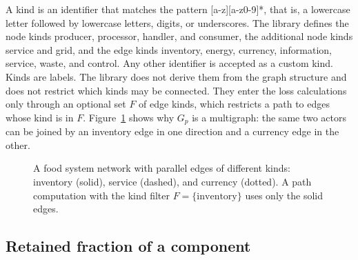 \documentclass[12pt]{article}
\newcommand{\code}[1]{{\ttfamily\def\_{\textunderscore\allowbreak}#1}}
\theoremstyle{plain}
\theoremstyle{definition}
\begin{document}
A kind is an identifier that matches the pattern \code{[a-z][a-z0-9\_]*}, that is, a lowercase letter followed by lowercase letters, digits, or underscores. The library defines the node kinds producer, processor, handler, and consumer, the additional node kinds service and grid, and the edge kinds inventory, energy, currency, information, service, waste, and control. Any other identifier is accepted as a custom kind. Kinds are labels. The library does not derive them from the graph structure and does not restrict which kinds may be connected. They enter the loss calculations only through an optional set $F$ of edge kinds, which restricts a path to edges whose kind is in $F$. Figure~\ref{fig:network} shows why $G_p$ is a multigraph: the same two actors can be joined by an inventory edge in one direction and a currency edge in the other.

\begin{figure}[htbp]
\centering
{}
\caption{A food system network with parallel edges of different kinds: inventory (solid), service (dashed), and currency (dotted). A path computation with the kind filter $F=\{\text{inventory}\}$ uses only the solid edges.}
\label{fig:network}
\end{figure}

\subsection{Retained fraction of a component}
\end{document}
